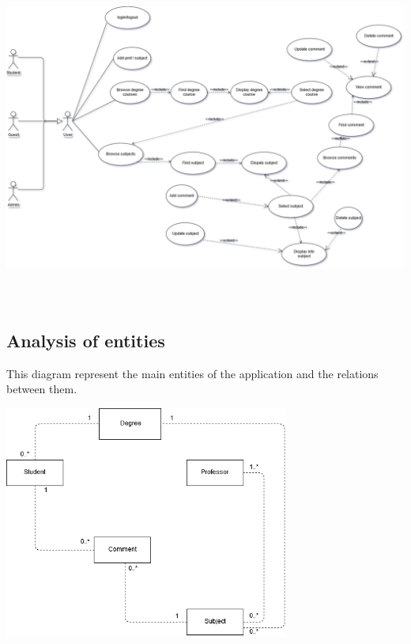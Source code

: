 \documentclass[a4paper]{article}
\begin{document}
\begin{minipage}{\linewidth}
\begin{center}
\vspace{8mm}
\includegraphics[height=11cm]{./images/diagrams/UseCases.png} 
\vspace{3mm}
\end{center}
\end{minipage}

\clearpage

\subsection{Analysis of entities}
This diagram represent the main entities of the application and the relations between them.
\begin{minipage}{\linewidth}
\begin{center}
\vspace{4mm}
\includegraphics[width = 0.7\textwidth]{./images/diagrams/AnalysisUML.png} 
\vspace{2mm}
\label{fig:analisys_diagram}
\end{center}
\end{minipage}
\end{document}
